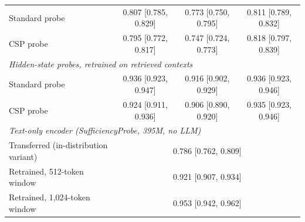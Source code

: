 \documentclass[acmsmall,screen,review]{acmart}
\newcommand{\sprobe}{SufficiencyProbe}
\begin{document}
\begin{table}[t]
\begin{tabular}{lccc}
Standard probe & 0.807 [0.785, 0.829] & 0.773 [0.750, 0.795] & 0.811 [0.789, 0.832] \\
CSP probe & 0.795 [0.772, 0.817] & 0.747 [0.724, 0.773] & 0.818 [0.797, 0.839] \\
\multicolumn{4}{l}{\emph{Hidden-state probes, retrained on retrieved contexts}} \\
Standard probe & 0.936 [0.923, 0.947] & 0.916 [0.902, 0.929] & 0.936 [0.923, 0.946] \\
CSP probe & 0.924 [0.911, 0.936] & 0.906 [0.890, 0.920] & 0.935 [0.923, 0.946] \\
\multicolumn{4}{l}{\emph{Text-only encoder (\sprobe{}, 395M, no LLM)}} \\
Transferred (in-distribution variant) & \multicolumn{3}{c}{0.786 [0.762, 0.809]} \\
Retrained, 512-token window & \multicolumn{3}{c}{0.921 [0.907, 0.934]} \\
Retrained, 1,024-token window & \multicolumn{3}{c}{0.953 [0.942, 0.962]} \\
\bottomrule
\end{tabular}
\end{table}
\end{document}
